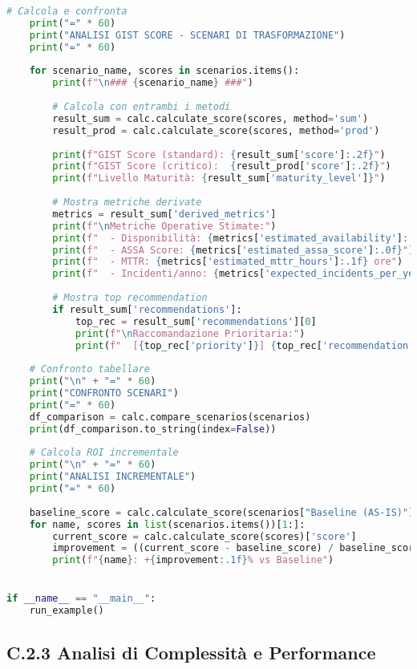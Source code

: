 \begin{lstlisting}[language=Python, caption={Implementazione completa GIST Calculator con validazione e reporting}]
    # Calcola e confronta
    print("=" * 60)
    print("ANALISI GIST SCORE - SCENARI DI TRASFORMAZIONE")
    print("=" * 60)
    
    for scenario_name, scores in scenarios.items():
        print(f"\n### {scenario_name} ###")
        
        # Calcola con entrambi i metodi
        result_sum = calc.calculate_score(scores, method='sum')
        result_prod = calc.calculate_score(scores, method='prod')
        
        print(f"GIST Score (standard): {result_sum['score']:.2f}")
        print(f"GIST Score (critico):  {result_prod['score']:.2f}")
        print(f"Livello Maturità: {result_sum['maturity_level']}")
        
        # Mostra metriche derivate
        metrics = result_sum['derived_metrics']
        print(f"\nMetriche Operative Stimate:")
        print(f"  - Disponibilità: {metrics['estimated_availability']:.3f}%")
        print(f"  - ASSA Score: {metrics['estimated_assa_score']:.0f}")
        print(f"  - MTTR: {metrics['estimated_mttr_hours']:.1f} ore")
        print(f"  - Incidenti/anno: {metrics['expected_incidents_per_year']:.0f}")
        
        # Mostra top recommendation
        if result_sum['recommendations']:
            top_rec = result_sum['recommendations'][0]
            print(f"\nRaccomandazione Prioritaria:")
            print(f"  [{top_rec['priority']}] {top_rec['recommendation']}")
    
    # Confronto tabellare
    print("\n" + "=" * 60)
    print("CONFRONTO SCENARI")
    print("=" * 60)
    df_comparison = calc.compare_scenarios(scenarios)
    print(df_comparison.to_string(index=False))
    
    # Calcola ROI incrementale
    print("\n" + "=" * 60)
    print("ANALISI INCREMENTALE")
    print("=" * 60)
    
    baseline_score = calc.calculate_score(scenarios["Baseline (AS-IS)"])['score']
    for name, scores in list(scenarios.items())[1:]:
        current_score = calc.calculate_score(scores)['score']
        improvement = ((current_score - baseline_score) / baseline_score) * 100
        print(f"{name}: +{improvement:.1f}% vs Baseline")


if __name__ == "__main__":
    run_example()
\end{lstlisting}

\subsection{C.2.3 Analisi di Complessità e Performance}

